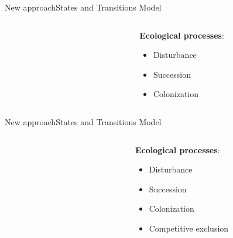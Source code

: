 \documentclass[10pt,aspectratio=149]{beamer}
\begin{document}
\begin{frame}{New approach}{States and Transitions Model}


\begin{columns}[t]
	\begin{column}[t]{.40\paperwidth}
		\begin{figure}
			\small{}
		\end{figure}
	\end{column}
	\begin{column}[t]{.50\paperwidth}
	\textbf{Ecological processes}:
	\begin{itemize}
		\item Disturbance
		\item Succession
		\item Colonization
	\end{itemize}
	\end{column}
\end{columns}

\end{frame}


\begin{frame}{New approach}{States and Transitions Model}


\begin{columns}[t]
	\begin{column}[t]{.40\paperwidth}
		\begin{figure}
			\small{}
		\end{figure}
	\end{column}
	\begin{column}[t]{.50\paperwidth}
	\textbf{Ecological processes}:
	\begin{itemize}
		\item Disturbance
		\item Succession
		\item Colonization
		\item Competitive exclusion
	\end{itemize}
	\end{column}
\end{columns}

\end{frame}




\end{document}
